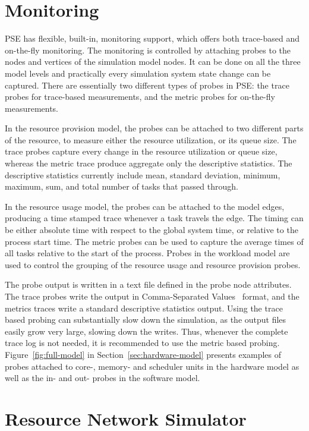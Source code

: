\section{Monitoring}

PSE has flexible, built-in, monitoring support, which offers both trace-based and on-the-fly monitoring. The monitoring is controlled by attaching probes to the nodes and vertices of the simulation model nodes. It can be done on all the three model levels and practically every simulation system state change can be captured. There are essentially two different types of probes in PSE: the trace probes for trace-based measurements, and the metric probes for on-the-fly measurements.

In the resource provision model, the probes can be attached to two different parts of the resource, to measure either the resource utilization, or its queue size. The trace probes capture every change in the resource utilization or queue size, whereas the metric trace produce aggregate only the descriptive statistics. The descriptive statistics currently include mean, standard deviation, minimum, maximum, sum, and total number of tasks that passed through.

In the resource usage model, the probes can be attached to the model edges, producing a time stamped trace whenever a task travels the edge. The timing can be either absolute time with respect to the global system time, or relative to the process start time. The metric probes can be used to capture the average times of all tasks relative to the start of the process. Probes in the workload model are used to control the grouping of the resource usage and resource provision probes.

The probe output is written in a text file defined in the probe node attributes. The trace probes write the output in Comma-Separated Values~\cite{Shafranovic:2005:CSV} format, and the metrics traces write a standard descriptive statistics output. Using the trace based probing can substantially slow down the simulation, as the output files easily grow very large, slowing down the writes. Thus, whenever the complete trace log is not needed, it is recommended to use the metric based probing. Figure~\ref{fig:full-model} in Section~\ref{sec:hardware-model} presents examples of probes attached to core-, memory- and scheduler units in the hardware model as well as the in- and out- probes in the software model.

\section{Resource Network Simulator}
\label{sec:resource-network-simulator}

